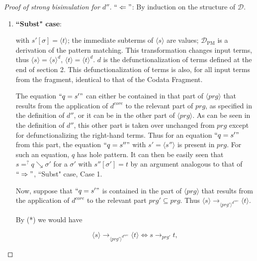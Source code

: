 \documentclass[11pt]{article} %
\begin{document}
\begin{proof}[Proof of strong bisimulation for $d''$]
$`` \Leftarrow "$: By induction on the structure of $\mathcal{D}$.

\begin{enumerate}
\item \textbf{``Subst" case}:

\begin{prooftree}
\end{prooftree}

with $s'[\sigma] = \langle t \rangle$; the immediate subterms of $\langle s \rangle$ are values; $\mathcal{D}_{\textrm{PM}}$ is a derivation of the pattern matching. This transformation changes input terms, thus $\langle s \rangle = \langle s \rangle^d$, $\langle t \rangle = \langle t \rangle^d$. $d$ is the defunctionalization of terms defined at the end of section 2. This defunctionalization of terms is also, for all input terms from the fragment, identical to that of the Codata Fragment.

The equation $`` q = s' "$ can either be contained in that part of $\langle prg \rangle$ that results from the application of $d^{core}$ to the relevant part of $prg$, as specified in the definition of $d''$, or it can be in the other part of $\langle prg \rangle$. As can be seen in the definition of $d''$, this other part is taken over unchanged from $prg$ except for defunctionalizing the right-hand terms. Thus for an equation $`` q = s' "$ from this part, the equation $`` q = s'' "$ with $s' = \langle s'' \rangle$ is present in $prg$. For such an equation, $q$ has hole pattern. It can then be easily seen that $s =^? q \searrow \sigma'$ for a $\sigma'$ with $s''[\sigma'] = t$ by an argument analogous to that of $`` \Rightarrow "$, ``Subst" case, Case 1.

Now, suppose that $`` q = s' "$ is contained in the part of $\langle prg \rangle$ that results from the application of $d^{core}$ to the relevant part $prg' \subseteq prg$. Thus $\langle s \rangle \longrightarrow_{\langle prg' \rangle^{d^{core}}} \langle t \rangle$.

By (*) we would have

\begin{equation*}
\langle s \rangle \longrightarrow_{\langle prg' \rangle^{d^{core}}} \langle t \rangle \iff s \longrightarrow_{prg'} t,
\end{equation*}


\end{enumerate}
\end{proof}
\end{document}
